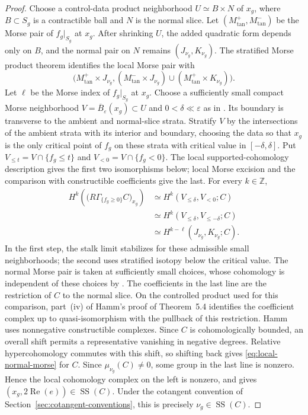 \documentclass[10pt]{amsart}
\numberwithin{equation}{section}
\theoremstyle{plain}
\theoremstyle{definition}
\theoremstyle{remark}
\newcommand{\ZZ}{\mathbb Z}
\newcommand{\SSupp}{\operatorname{SS}}
\begin{document}
\begin{proof}
Choose a control-data product neighborhood $U\simeq B\times N$ of $x_g$,
where $B\subset S_g$ is a contractible ball and $N$ is the normal slice.
Let $(M^+_{\mathrm{tan}},M^-_{\mathrm{tan}})$ be the Morse pair of
$f_g|_{S_g}$ at $x_g$. After shrinking $U$, the added quadratic form
depends only on $B$, and the normal pair on $N$ remains
$(J_{\nu_g},K_{\nu_g})$. The stratified Morse product theorem
\cite[Theorem~3.7, pp.~65--66, and \S6.A.1, pp.~222--223]{GM88}
identifies the local Morse pair with
\[
 \bigl(M^+_{\mathrm{tan}}\times J_{\nu_g},
 (M^-_{\mathrm{tan}}\times J_{\nu_g})
 \cup(M^+_{\mathrm{tan}}\times K_{\nu_g})\bigr).
\]
Let $\ell$ be the Morse index of $f_g|_{S_g}$ at $x_g$.
Choose a sufficiently small compact Morse neighborhood
$V=\overline B_\varepsilon(x_g)\subset U$ and $0<\delta\ll\varepsilon$
as in \cite[Lemma~10.5]{Gor21}. Its boundary is transverse to the
ambient and normal-slice strata. Stratify $V$ by the intersections
of the ambient strata with its interior and boundary, choosing the
data so that $x_g$ is the only critical point
of $f_g$ on these strata with critical value in $[-\delta,\delta]$.
Put $V_{\le t}=V\cap\{f_g\le t\}$ and
$V_{<0}=V\cap\{f_g<0\}$.
The local supported-cohomology description
\cite[\S10.8, pp.~45--46]{Gor21} gives the first two isomorphisms
below; local Morse excision and the comparison with constructible
coefficients \cite[Theorems~5.3--5.4, especially part~(iv) of the proof
of Theorem~5.4, pp.~153--157]{Hamm15} give the last. For every $k\in\ZZ$,
\begin{equation}\label{eq:local-normal-morse}
\begin{aligned}
 H^k\!\left(\bigl(R\Gamma_{\{f_g\geq0\}}C\bigr)_{x_g}\right)
 &\simeq H^k(V_{\le\delta},V_{<0};C)\\
 &\simeq H^k(V_{\le\delta},V_{\le-\delta};C)\\
 &\simeq H^{k-\ell}(J_{\nu_g},K_{\nu_g};C).
\end{aligned}
\end{equation}
In the first step, the stalk limit stabilizes for these admissible
small neighborhoods; the second uses stratified isotopy below the
critical value. The normal Morse pair is taken at sufficiently small
choices, whose cohomology is independent of these choices by
\cite[(24.10) and Definition~24.11]{ABV92}.
The coefficients in the last line are the restriction of $C$ to the
normal slice. On the controlled product used for this comparison,
part~(iv) of Hamm's proof of Theorem~5.4 identifies the coefficient complex up to
quasi-isomorphism with the pullback of this restriction.
Hamm uses nonnegative constructible complexes. Since $C$ is
cohomologically bounded, an overall shift permits a representative
vanishing in negative degrees. Relative hypercohomology commutes
with this shift, so shifting back gives
\eqref{eq:local-normal-morse} for $C$.
Since $\mu_{\nu_g}(C)\neq0$, some group in the last line is nonzero.
Hence the local cohomology complex on the left is nonzero, and
\cite[Theorem~3.1.1]{KS85} gives
$(x_g,2\operatorname{Re}(e))\in\SSupp(C)$. Under the cotangent convention
of Section~\ref{sec:cotangent-conventions}, this is precisely
$\nu_g\in\SSupp(C)$.
\end{proof}
\end{document}
